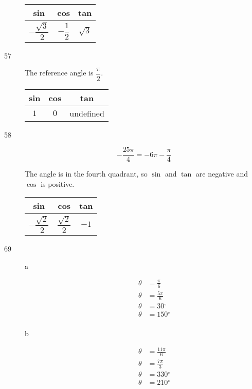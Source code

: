 \documentclass[fleqn,addpoints]{exam}
\newcommand{\degree}{\ensuremath{^\circ}}
\begin{document}
\begin{description}
\begin{tabular}{ccc}
\toprule
sin & cos & tan \\
\midrule
  $-\dfrac{\sqrt{3}}{2}$ & $-\dfrac{1}{2}$ & $\sqrt{3}$ \\
\bottomrule
\end{tabular}

\item[57]

The reference angle is $\dfrac{\pi}{2}$.

\begin{tabular}{ccc}
\toprule
sin & cos & tan \\
\midrule
  $1$ & $0$ & undefined \\
\bottomrule
\end{tabular}

\item[58]
\[
  -\frac{25 \pi}{4} = -6 \pi - \frac{\pi}{4}
\]

The angle is in the fourth quadrant, so $\sin$ and $\tan$ are negative and $\cos$ is positive.

\begin{tabular}{ccc}
\toprule
sin & cos & tan \\
\midrule
  $-\dfrac{\sqrt{2}}{2}$ & $\dfrac{\sqrt{2}}{2}$ & $-1$ \\
\bottomrule
\end{tabular}

\item[69]
\begin{description}
\item[a]
\begin{align*}
  \theta &= \frac{\pi}{6} \\
  \theta &= \frac{5 \pi}{6} \\
  \theta &= 30 \degree \\
  \theta &= 150 \degree \\
\end{align*}

\item[b]
\begin{align*}
  \theta &= \frac{11 \pi}{6} \\
  \theta &= \frac{7 \pi}{3} \\
  \theta &= 330 \degree \\
  \theta &= 210 \degree \\
\end{align*}

\end{description}


\end{description}
\end{document}
